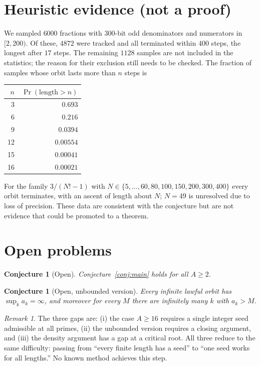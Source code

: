 \documentclass[11pt]{amsart}
\theoremstyle{plain}
\newtheorem{conjecture}[theorem]{Conjecture}
\theoremstyle{definition}
\theoremstyle{remark}
\newtheorem{remark}[theorem]{Remark}
\begin{document}
\section{Heuristic evidence (not a proof)}\label{sec:heur}

We sampled $6000$ fractions with $300$-bit odd denominators and numerators in $[2,200)$. Of these, $4872$ were tracked and all terminated within $400$ steps, the longest after $17$ steps. The remaining $1128$ samples are not included in the statistics; the reason for their exclusion still needs to be checked. The fraction of samples whose orbit lasts more than $n$ steps is
\begin{center}
\begin{tabular}{rr}
\hline
$n$ & $\Pr(\text{length}>n)$\\
\hline
3 & $0.693$\\
6 & $0.216$\\
9 & $0.0394$\\
12 & $0.00554$\\
15 & $0.00041$\\
16 & $0.00021$\\
\hline
\end{tabular}
\end{center}
For the family $3/(N!-1)$ with $N\in\{5,\dots,60,80,100,150,200,300,400\}$ every orbit terminates, with an ascent of length about $N$; $N=49$ is unresolved due to loss of precision. These data are consistent with the conjecture but are not evidence that could be promoted to a theorem.

\section{Open problems}\label{sec:open}

\begin{conjecture}[Open]
Conjecture~\ref{conj:main} holds for all $A\ge 2$.
\end{conjecture}

\begin{conjecture}[Open, unbounded version]\label{conj:unbounded}
Every infinite lawful orbit has $\sup_k a_k=\infty$, and moreover for every $M$ there are infinitely many $k$ with $a_k>M$.
\end{conjecture}

\begin{remark}
The three gaps are: (i) the case $A\ge 16$ requires a single integer seed admissible at all primes, (ii) the unbounded version requires a closing argument, and (iii) the density argument has a gap at a critical root. All three reduce to the same difficulty: passing from ``every finite length has a seed'' to ``one seed works for all lengths.'' No known method achieves this step.
\end{remark}
\end{document}
